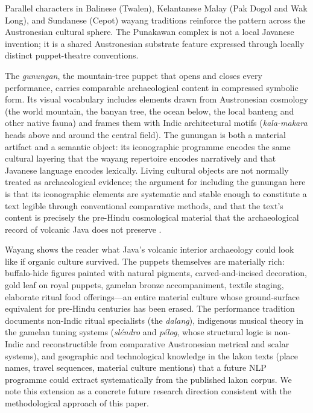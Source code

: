\documentclass[12pt,a4paper]{article}
\begin{document}
Parallel characters in Balinese (Twalen), Kelantanese Malay (Pak Dogol and Wak Long), and Sundanese (Cepot) wayang traditions reinforce the pattern across the Austronesian cultural sphere. The Punakawan complex is not a local Javanese invention; it is a shared Austronesian substrate feature expressed through locally distinct puppet-theatre conventions.

The \textit{gunungan}, the mountain-tree puppet that opens and closes every performance, carries comparable archaeological content in compressed symbolic form. Its visual vocabulary includes elements drawn from Austronesian cosmology (the world mountain, the banyan tree, the ocean below, the local banteng and other native fauna) and frames them with Indic architectural motifs (\textit{kala-makara} heads above and around the central field). The gunungan is both a material artifact and a semantic object: its iconographic programme encodes the same cultural layering that the wayang repertoire encodes narratively and that Javanese language encodes lexically. Living cultural objects are not normally treated as archaeological evidence; the argument for including the gunungan here is that its iconographic elements are systematic and stable enough to constitute a text legible through conventional comparative methods, and that the text's content is precisely the pre-Hindu cosmological material that the archaeological record of volcanic Java does not preserve \citep[see][]{kieven2013}.

Wayang shows the reader what Java's volcanic interior archaeology could look like if organic culture survived. The puppets themselves are materially rich: buffalo-hide figures painted with natural pigments, carved-and-incised decoration, gold leaf on royal puppets, gamelan bronze accompaniment, textile staging, elaborate ritual food offerings---an entire material culture whose ground-surface equivalent for pre-Hindu centuries has been erased. The performance tradition documents non-Indic ritual specialists (the \textit{dalang}), indigenous musical theory in the gamelan tuning systems (\textit{sléndro} and \textit{pélog}, whose structural logic is non-Indic and reconstructible from comparative Austronesian metrical and scalar systems), and geographic and technological knowledge in the lakon texts (place names, travel sequences, material culture mentions) that a future NLP programme could extract systematically from the published lakon corpus. We note this extension as a concrete future research direction consistent with the methodological approach of this paper.
\end{document}
